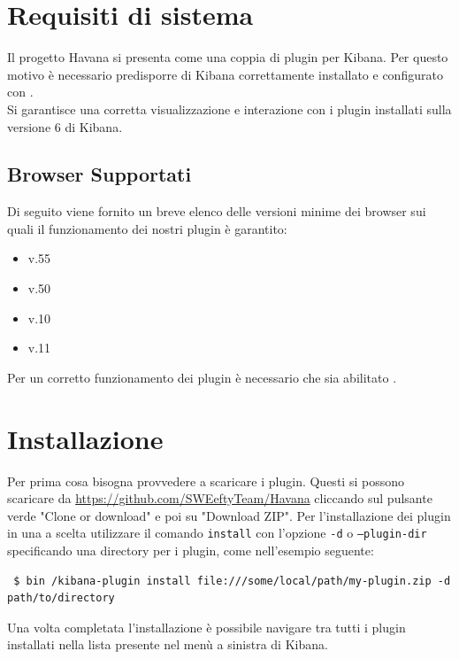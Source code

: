 \newpage
\section{Requisiti di sistema}
Il progetto Havana si presenta come una coppia di plugin per Kibana. Per questo motivo è necessario predisporre di Kibana correttamente installato e configurato con .
\\ Si garantisce una corretta visualizzazione e interazione con i plugin installati sulla versione 6 di Kibana.
\subsection{Browser Supportati}

Di seguito viene fornito un breve elenco delle versioni minime dei browser sui quali il funzionamento dei nostri plugin è garantito:
\begin{itemize}
	
	\item {} v.55
	\item {} v.50
	\item {} v.10
	\item {} v.11
	
\end{itemize}

Per un corretto funzionamento dei plugin è necessario che sia abilitato .


\section{Installazione}
Per prima cosa bisogna provvedere a scaricare i plugin. Questi si possono scaricare da \href{https://github.com/SWEeftyTeam/Havana}{https://github.com/SWEeftyTeam/Havana} cliccando sul pulsante verde "Clone or download" e poi su "Download ZIP".
Per l'installazione dei plugin in una  a scelta utilizzare il comando \texttt{install} con l'opzione \texttt{-d} o \texttt{--plugin-dir}  specificando una directory per i plugin, come nell'esempio seguente:
\begin{lstlisting}
 $ bin /kibana-plugin install file:///some/local/path/my-plugin.zip -d path/to/directory 
\end{lstlisting}

Una volta completata l'installazione è possibile navigare tra tutti i plugin installati nella lista presente nel menù a sinistra di Kibana.

